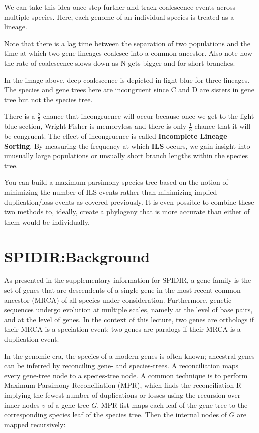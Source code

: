 We can take this idea once step further and track coalescence events 
across multiple species. Here, each genome of an individual species is treated as a lineage.

Note that there is a lag time between the separation of two populations and 
the time at which two gene lineages coalesce into a common ancestor.
Also note how the rate of coalescence slows down as N gets bigger and for short branches.

In the image above, deep coalescence is depicted in light blue for three 
lineages. The species and gene trees here are incongruent since 
C and D are sisters in gene tree but not the species tree.

There is a $\frac{2}{3}$ chance that incongruence 
will occur because once we get to the light blue section, Wright-Fisher
is memoryless and there is only $\frac{1}{3}$ chance that it will be
congruent. The effect of incongruence is called \textbf{Incomplete Lineage Sorting}. By measuring the frequency at which \textbf{ILS} occurs, we gain insight into unusually large populations or unsually short branch lengths within the species tree.

You can build a maximum parsimony species tree based on the notion of minimizing the number of ILS events rather than minimizing implied duplication/loss events as covered previously. It is even possible to combine these two methods to, ideally, create a phylogeny that is more accurate than either of them would be individually.

\section{SPIDIR:Background} 
As presented in the supplementary information for SPIDIR, a gene
family is the set of genes that are descendents of a single gene in
the most recent common ancestor (MRCA) of all species under
consideration. Furthermore, genetic sequences undergo evolution at
multiple scales, namely at the level of base pairs, and at the level
of genes. In the context of this lecture, two genes are orthologs if
their MRCA is a speciation event; two genes are paralogs if their MRCA
is a duplication event.

In the genomic era, the species of a modern genes is often known;
ancestral genes can be inferred by reconciling gene- and
species-trees. A reconciliation maps every gene-tree node to a
species-tree node. A common technique is to perform Maximum Parsimony
Reconciliation (MPR), which finds the reconciliation R implying the
fewest number of duplications or losses using the recursion over inner
nodes $v$ of a gene tree $G$. MPR fist maps each leaf of the gene tree
to the corresponding species leaf of the species tree. Then the
internal nodes of $G$ are mapped recursively:

